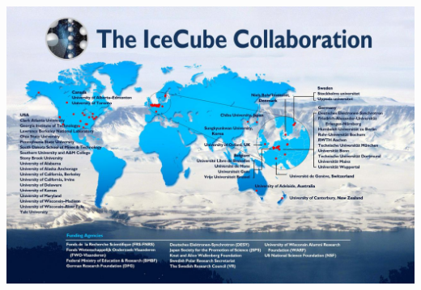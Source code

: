 \Tr
\onecolumn
\begin{center}
\includegraphics[keepaspectratio,height=15cm]{icecube-collab}
\end{center}

